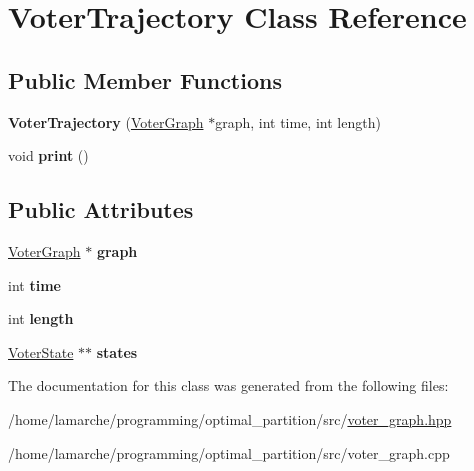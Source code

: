 \hypertarget{classVoterTrajectory}{\section{Voter\-Trajectory Class Reference}
\label{classVoterTrajectory}
}
\subsection*{Public Member Functions}
\begin{DoxyCompactItemize}
\item 
\hypertarget{classVoterTrajectory_aeed05c584f004a49264220c6d28a9bf6}{{\bfseries Voter\-Trajectory} (\hyperlink{classVoterGraph}{Voter\-Graph} $\ast$graph, int time, int length)}\label{classVoterTrajectory_aeed05c584f004a49264220c6d28a9bf6}

\item 
\hypertarget{classVoterTrajectory_a26679dac87b6f3659e6535cfab866254}{void {\bfseries print} ()}\label{classVoterTrajectory_a26679dac87b6f3659e6535cfab866254}

\end{DoxyCompactItemize}
\subsection*{Public Attributes}
\begin{DoxyCompactItemize}
\item 
\hypertarget{classVoterTrajectory_a650891344ead65411afe1568049f806b}{\hyperlink{classVoterGraph}{Voter\-Graph} $\ast$ {\bfseries graph}}\label{classVoterTrajectory_a650891344ead65411afe1568049f806b}

\item 
\hypertarget{classVoterTrajectory_a11c81f8457dd6bcffd4f757827f281d7}{int {\bfseries time}}\label{classVoterTrajectory_a11c81f8457dd6bcffd4f757827f281d7}

\item 
\hypertarget{classVoterTrajectory_aafa577619f3ae1d3de54cc8dd6d1636e}{int {\bfseries length}}\label{classVoterTrajectory_aafa577619f3ae1d3de54cc8dd6d1636e}

\item 
\hypertarget{classVoterTrajectory_a352892f77ab95ac223c7621e12e73b5e}{\hyperlink{classVoterState}{Voter\-State} $\ast$$\ast$ {\bfseries states}}\label{classVoterTrajectory_a352892f77ab95ac223c7621e12e73b5e}

\end{DoxyCompactItemize}


The documentation for this class was generated from the following files\-:\begin{DoxyCompactItemize}
\item 
/home/lamarche/programming/optimal\-\_\-partition/src/\hyperlink{voter__graph_8hpp}{voter\-\_\-graph.\-hpp}\item 
/home/lamarche/programming/optimal\-\_\-partition/src/voter\-\_\-graph.\-cpp\end{DoxyCompactItemize}
